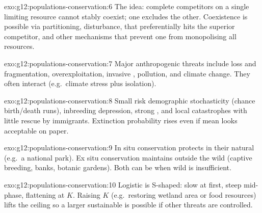 \begin{solution}{exo:g12:populations-conservation:6}
The  idea: complete competitors on a single limiting
resource cannot stably coexist; one excludes the other. Coexistence is possible
via  partitioning, disturbance,  that preferentially hits the
superior competitor, and other mechanisms that prevent one  from
monopolising all resources.
\end{solution}

\begin{solution}{exo:g12:populations-conservation:7}
Major anthropogenic threats include  loss and fragmentation,
overexploitation, invasive , pollution, and climate change. They often
interact (e.g.\ climate stress plus  isolation).
\end{solution}

\begin{solution}{exo:g12:populations-conservation:8}
Small  risk demographic stochasticity (chance birth/death runs),
inbreeding depression, strong , and local catastrophes with
little rescue by immigrants. Extinction probability rises even if mean 
looks acceptable on paper.
\end{solution}

\begin{solution}{exo:g12:populations-conservation:9}
In situ conservation protects  in their natural  (e.g.\ a
national park). Ex situ conservation maintains  outside the wild
(captive breeding,  banks, botanic gardens). Both can be 
when wild  is insufficient.
\end{solution}

\begin{solution}{exo:g12:populations-conservation:10}
Logistic  is S-shaped: slow at first, steep mid-phase, flattening at
$K$. Raising $K$ (e.g.\ restoring wetland area or food resources) lifts the
ceiling so a larger sustainable  is possible if other threats are
controlled.
\end{solution}

